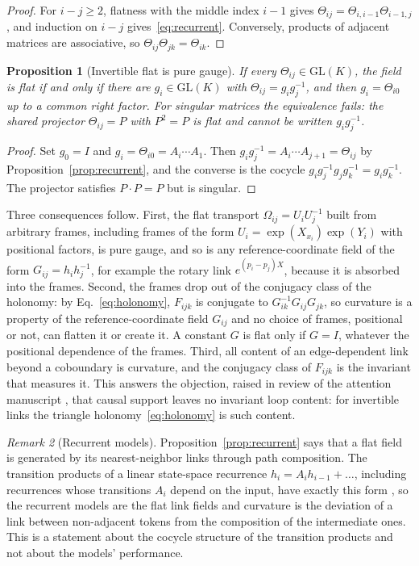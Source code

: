 \documentclass[11pt]{article}
\newtheorem{proposition}{Proposition}
\theoremstyle{definition}
\theoremstyle{remark}
\newtheorem{remark}[proposition]{Remark}
\newcommand{\GL}{\mathrm{GL}}
\begin{document}
\begin{proof}
For $i-j\ge2$, flatness with the middle index $i-1$ gives $\Theta_{ij}=\Theta_{i,i-1}\Theta_{i-1,j}$, and induction on $i-j$ gives~\eqref{eq:recurrent}. Conversely, products of adjacent matrices are associative, so $\Theta_{ij}\Theta_{jk}=\Theta_{ik}$.
\end{proof}

\begin{proposition}[Invertible flat is pure gauge]
\label{prop:puregauge}
If every $\Theta_{ij}\in\GL(K)$, the field is flat if and only if there are $g_i\in\GL(K)$ with $\Theta_{ij}=g_ig_j^{-1}$, and then $g_i=\Theta_{i0}$ up to a common right factor. For singular matrices the equivalence fails: the shared projector $\Theta_{ij}=P$ with $P^2=P$ is flat and cannot be written $g_ig_j^{-1}$.
\end{proposition}

\begin{proof}
Set $g_0=I$ and $g_i=\Theta_{i0}=A_i\cdots A_1$. Then $g_ig_j^{-1}=A_i\cdots A_{j+1}=\Theta_{ij}$ by Proposition~\ref{prop:recurrent}, and the converse is the cocycle $g_ig_j^{-1}g_jg_k^{-1}=g_ig_k^{-1}$. The projector satisfies $P\cdot P=P$ but is singular.
\end{proof}

Three consequences follow. First, the flat transport $\Omega_{ij}=U_iU_j^{-1}$ built from arbitrary frames, including frames of the form $U_i=\exp(X_{x_i})\exp(Y_i)$ with positional factors, is pure gauge, and so is any reference-coordinate field of the form $G_{ij}=h_ih_j^{-1}$, for example the rotary link $e^{(p_i-p_j)X}$, because it is absorbed into the frames. Second, the frames drop out of the conjugacy class of the holonomy: by Eq.~\eqref{eq:holonomy}, $F_{ijk}$ is conjugate to $G_{ik}^{-1}G_{ij}G_{jk}$, so curvature is a property of the reference-coordinate field $G_{ij}$ and no choice of frames, positional or not, can flatten it or create it. A constant $G$ is flat only if $G=I$, whatever the positional dependence of the frames. Third, all content of an edge-dependent link beyond a coboundary is curvature, and the conjugacy class of $F_{ijk}$ is the invariant that measures it. This answers the objection, raised in review of the attention manuscript \cite{glkreview2026}, that causal support leaves no invariant loop content: for invertible links the triangle holonomy~\eqref{eq:holonomy} is such content.

\begin{remark}[Recurrent models]
Proposition~\ref{prop:recurrent} says that a flat field is generated by its nearest-neighbor links through path composition. The transition products of a linear state-space recurrence $h_i=A_ih_{i-1}+\dots$, including recurrences whose transitions $A_i$ depend on the input, have exactly this form \cite{gu2022s4,gu2023mamba}, so the recurrent models are the flat link fields and curvature is the deviation of a link between non-adjacent tokens from the composition of the intermediate ones. This is a statement about the cocycle structure of the transition products and not about the models' performance.
\end{remark}
\end{document}

